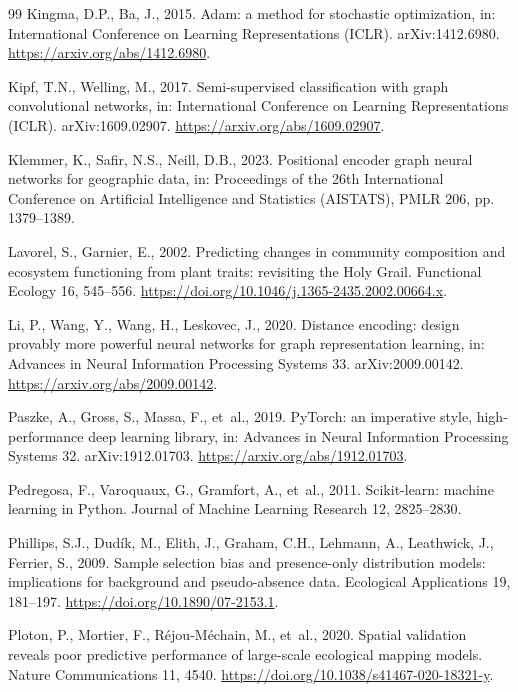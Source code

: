 \documentclass[a4paper,fleqn]{cas-sc}
\begin{document}
\begin{thebibliography}{99}
 Kingma, D.P., Ba, J., 2015. Adam: a method for stochastic optimization, in: International Conference on Learning Representations (ICLR). arXiv:1412.6980. \url{https://arxiv.org/abs/1412.6980}.

 Kipf, T.N., Welling, M., 2017. Semi-supervised classification with graph convolutional networks, in: International Conference on Learning Representations (ICLR). arXiv:1609.02907. \url{https://arxiv.org/abs/1609.02907}.

 Klemmer, K., Safir, N.S., Neill, D.B., 2023. Positional encoder graph neural networks for geographic data, in: Proceedings of the 26th International Conference on Artificial Intelligence and Statistics (AISTATS), PMLR 206, pp. 1379--1389.

 Lavorel, S., Garnier, E., 2002. Predicting changes in community composition and ecosystem functioning from plant traits: revisiting the Holy Grail. Functional Ecology 16, 545--556. \url{https://doi.org/10.1046/j.1365-2435.2002.00664.x}.

 Li, P., Wang, Y., Wang, H., Leskovec, J., 2020. Distance encoding: design provably more powerful neural networks for graph representation learning, in: Advances in Neural Information Processing Systems 33. arXiv:2009.00142. \url{https://arxiv.org/abs/2009.00142}.

 Paszke, A., Gross, S., Massa, F., et~al., 2019. PyTorch: an imperative style, high-performance deep learning library, in: Advances in Neural Information Processing Systems 32. arXiv:1912.01703. \url{https://arxiv.org/abs/1912.01703}.

 Pedregosa, F., Varoquaux, G., Gramfort, A., et~al., 2011. Scikit-learn: machine learning in Python. Journal of Machine Learning Research 12, 2825--2830.

 Phillips, S.J., Dud\'ik, M., Elith, J., Graham, C.H., Lehmann, A., Leathwick, J., Ferrier, S., 2009. Sample selection bias and presence-only distribution models: implications for background and pseudo-absence data. Ecological Applications 19, 181--197. \url{https://doi.org/10.1890/07-2153.1}.

 Ploton, P., Mortier, F., R\'ejou-M\'echain, M., et~al., 2020. Spatial validation reveals poor predictive performance of large-scale ecological mapping models. Nature Communications 11, 4540. \url{https://doi.org/10.1038/s41467-020-18321-y}.


\end{thebibliography}
\end{document}
